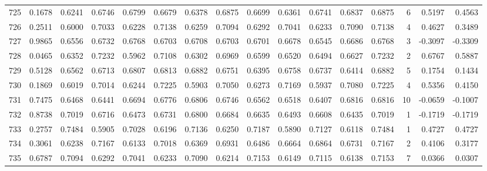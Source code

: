 \begin{tabular}{lrrrrrrrrrrrrrrr}
725 &      0.1678 &  0.6241 &  0.6746 &  0.6799 &  0.6679 &  0.6378 &  0.6875 &  0.6699 &  0.6361 &  0.6741 &   0.6837 &     0.6875 &      6 &                    0.5197 &                     0.4563 \\
726 &      0.2511 &  0.6000 &  0.7033 &  0.6228 &  0.7138 &  0.6259 &  0.7094 &  0.6292 &  0.7041 &  0.6233 &   0.7090 &     0.7138 &      4 &                    0.4627 &                     0.3489 \\
727 &      0.9865 &  0.6556 &  0.6732 &  0.6768 &  0.6703 &  0.6708 &  0.6703 &  0.6701 &  0.6678 &  0.6545 &   0.6686 &     0.6768 &      3 &                   -0.3097 &                    -0.3309 \\
728 &      0.0465 &  0.6352 &  0.7232 &  0.5962 &  0.7108 &  0.6302 &  0.6969 &  0.6599 &  0.6520 &  0.6494 &   0.6627 &     0.7232 &      2 &                    0.6767 &                     0.5887 \\
729 &      0.5128 &  0.6562 &  0.6713 &  0.6807 &  0.6813 &  0.6882 &  0.6751 &  0.6395 &  0.6758 &  0.6737 &   0.6414 &     0.6882 &      5 &                    0.1754 &                     0.1434 \\
730 &      0.1869 &  0.6019 &  0.7014 &  0.6244 &  0.7225 &  0.5903 &  0.7050 &  0.6273 &  0.7169 &  0.5937 &   0.7080 &     0.7225 &      4 &                    0.5356 &                     0.4150 \\
731 &      0.7475 &  0.6468 &  0.6441 &  0.6694 &  0.6776 &  0.6806 &  0.6746 &  0.6562 &  0.6518 &  0.6407 &   0.6816 &     0.6816 &     10 &                   -0.0659 &                    -0.1007 \\
732 &      0.8738 &  0.7019 &  0.6716 &  0.6473 &  0.6731 &  0.6800 &  0.6684 &  0.6635 &  0.6493 &  0.6608 &   0.6435 &     0.7019 &      1 &                   -0.1719 &                    -0.1719 \\
733 &      0.2757 &  0.7484 &  0.5905 &  0.7028 &  0.6196 &  0.7136 &  0.6250 &  0.7187 &  0.5890 &  0.7127 &   0.6118 &     0.7484 &      1 &                    0.4727 &                     0.4727 \\
734 &      0.3061 &  0.6238 &  0.7167 &  0.6133 &  0.7018 &  0.6369 &  0.6931 &  0.6486 &  0.6664 &  0.6864 &   0.6731 &     0.7167 &      2 &                    0.4106 &                     0.3177 \\
735 &      0.6787 &  0.7094 &  0.6292 &  0.7041 &  0.6233 &  0.7090 &  0.6214 &  0.7153 &  0.6149 &  0.7115 &   0.6138 &     0.7153 &      7 &                    0.0366 &                     0.0307 \\

\end{tabular}
